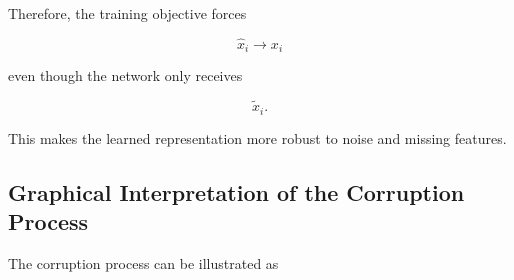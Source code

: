 \documentclass{article}
\begin{document}
Therefore, the training objective forces

\[
\widehat{x}_i
\rightarrow
x_i
\]

even though the network only receives

\[
\widetilde{x}_i.
\]

This makes the learned representation more robust to noise and missing
features.


\subsection{Graphical Interpretation of the Corruption Process}

The corruption process can be illustrated as
\end{document}

